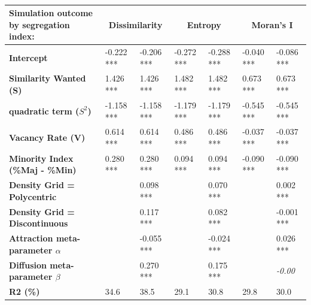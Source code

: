 \documentclass[Royal,sageh,times]{sagej}
\begin{document}
\begin{table}[]
\centering
\caption{}
\begin{adjustwidth}{-0.5cm}{-0.5cm}
\begin{tabular}{|m{2.5cm}|ll|ll|ll|}
\hline
Simulation outcome by segregation index:    & \multicolumn{2}{c|}{\textbf{Dissimilarity}}   & \multicolumn{2}{c|}{\textbf{Entropy}} & \multicolumn{2}{c|}{\textbf{Moran's I}} \\ \hline
\textbf{Intercept}                          & -0.222 *** & -0.206 ***                       & -0.272 ***        & -0.288 ***        & -0.040 ***           & -0.086 ***               \\ \hline
\textbf{Similarity Wanted (S)}              & 1.426 ***  & 1.426 ***                        & 1.482 ***         & 1.482 ***         & 0.673 ***            & 0.673 ***                \\ 
\textbf{quadratic term ($S^2$)}               & -1.158 *** & -1.158 ***                       & -1.179 ***        & -1.179 ***        & -0.545 ***           & -0.545 ***               \\ 
\textbf{Vacancy Rate (V)}                   & 0.614 ***  & 0.614 ***                        & 0.486 ***         & 0.486 ***         & -0.037 ***           & -0.037 ***               \\ 
\textbf{Minority Index (\%Maj - \%Min)}     & 0.280 ***  & 0.280 ***                        & 0.094 ***         & 0.094 ***         & -0.090 ***           & -0.090 ***               \\ \hline
\textbf{Density Grid = Polycentric}         &            & 0.098 ***                        &                   & 0.070 ***         &                      & 0.002 ***                \\ 
\textbf{Density Grid = Discontinuous}       &            & 0.117 ***                        &                   & 0.082 ***         &                      & -0.001 ***               \\
\textbf{Attraction meta-parameter $\alpha$} &            & -0.055 ***                       &                   & -0.024 ***        &                      & 0.026 ***                \\ 
\textbf{Diffusion meta-parameter $\beta$}   &            & 0.270 ***                        &                   & 0.175 ***         &                      & \textit{-0.00}           \\ \hline
\textbf{R2 (\%)}                            & 34.6       & 38.5                             & 29.1              & 30.8              & 29.8                 & 30.0                     \\ 

\end{tabular}
\end{adjustwidth}
\end{table}
\end{document}
